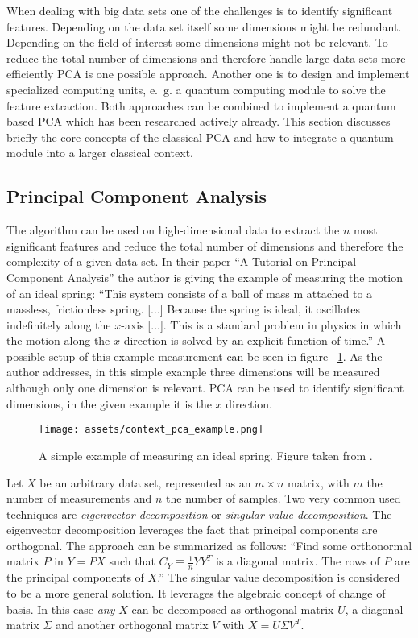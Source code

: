 \noindent
When dealing with big data sets one of the challenges is to identify significant features. Depending on the data set itself some dimensions might be redundant. Depending on the field of interest some dimensions might not be relevant. To reduce the total number of dimensions and therefore handle large data sets more efficiently PCA is one possible approach. Another one is to design and implement specialized computing units, e.~g. a quantum computing module to solve the feature extraction. Both approaches can be combined to implement a quantum based PCA which has been researched actively already. This section discusses briefly the core concepts of the classical PCA and how to integrate a quantum module into a larger classical context.

\subsection{Principal Component Analysis}
\label{subsec:pca}
The algorithm can be used on high-dimensional data to extract the $n$ most significant features and reduce the total number of dimensions and therefore the complexity of a given data set. In their paper \enquote{A Tutorial on Principal Component Analysis} \cite{Shlen_2014} the author is giving the example of measuring the motion of an ideal spring: \enquote{This system consists of a ball of mass m attached to a massless, frictionless spring. [...] Because the spring is ideal, it oscillates indefinitely along the $x$-axis [...]. This is a standard problem in physics in which the motion along the $x$ direction is solved by an explicit function of time.} A possible setup of this example measurement can be seen in figure ~\ref{fig:pcaexample}. As the author addresses, in this simple example three dimensions will be measured although only one dimension is relevant. PCA can be used to identify significant dimensions, in the given example it is the $x$ direction.

\begin{figure}
  \centering
  \texttt{[image: assets/context\_pca\_example.png]}
  \caption{A simple example of measuring an ideal spring. Figure taken from \cite{Shlen_2014}.}
  \label{fig:pcaexample}
\end{figure}

Let $X$ be an arbitrary data set, represented as an $m \times n$ matrix, with $m$ the number of measurements and $n$ the number of samples. Two very common used techniques are \emph{eigenvector decomposition} or \emph{singular value decomposition}. The eigenvector decomposition leverages the fact that principal components are orthogonal. The approach can be summarized as follows: \enquote{Find some orthonormal matrix $P$ in $Y = PX$ such that $C_Y \equiv \frac{1}{n} YY^T$ is a diagonal matrix. The rows of $P$ are the principal components of $X$.} The singular value decomposition is considered to be a more general solution. It leverages the algebraic concept of change of basis. In this case \emph{any} $X$ can be decomposed as orthogonal matrix $U$, a diagonal matrix $\Sigma$ and another orthogonal matrix $V$ with $X = U\Sigma V^T$. \cite{Shlen_2014}

